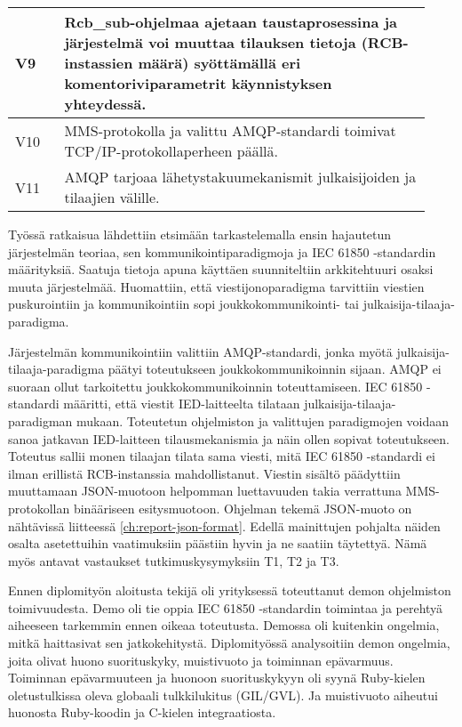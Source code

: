 \begin{table}[ht!]
\begin{tabular}{p{0.11\linewidth} | p{0.82\linewidth}}
		V9 & Rcb\_sub-ohjelmaa ajetaan taustaprosessina ja järjestelmä voi muuttaa tilauksen tietoja (RCB-instassien määrä) syöttämällä eri komentoriviparametrit käynnistyksen yhteydessä. \\
		\hline
		V10 & MMS-protokolla ja valittu AMQP-standardi toimivat TCP/IP-protokollaperheen päällä. \\
		\hline
		V11 & AMQP tarjoaa lähetystakuumekanismit julkaisijoiden ja tilaajien välille. \\
		\hline
	\end{tabular}
\end{table}

Työssä ratkaisua lähdettiin etsimään tarkastelemalla ensin hajautetun järjestelmän teoriaa, sen kommunikointiparadigmoja ja IEC 61850 -standardin määrityksiä. Saatuja tietoja apuna käyttäen suunniteltiin arkkitehtuuri osaksi muuta järjestelmää. Huomattiin, että viestijonoparadigma tarvittiin viestien puskurointiin ja kommunikointiin sopi jouk\-ko\-kom\-mu\-ni\-koin\-ti- tai julkaisija-tilaaja-paradigma.

Järjestelmän kommunikointiin valittiin AMQP-standardi, jonka myötä julkaisija-tilaaja-paradigma päätyi toteutukseen joukkokommunikoinnin sijaan. AMQP ei suoraan ollut tarkoitettu joukkokommunikoinnin toteuttamiseen. IEC 61850 -standardi määritti, että viestit IED-laitteelta tilataan julkaisija-tilaaja-paradigman mukaan. Toteutetun ohjelmiston ja valittujen paradigmojen voidaan sanoa jatkavan IED-laitteen tilausmekanismia ja näin ollen sopivat toteutukseen. Toteutus sallii monen tilaajan tilata sama viesti, mitä IEC 61850 -standardi ei ilman erillistä RCB-instanssia mahdollistanut. Viestin sisältö päädyttiin muuttamaan JSON-muotoon helpomman luettavuuden takia verrattuna MMS-protokollan binääriseen esitysmuotoon. Ohjelman tekemä JSON-muoto on nähtävissä liitteessä \ref{ch:report-json-format}. Edellä mainittujen pohjalta näiden osalta asetettuihin vaatimuksiin päästiin hyvin ja ne saatiin täytettyä. Nämä myös antavat vastaukset tutkimuskysymyksiin T1, T2 ja T3.

Ennen diplomityön aloitusta tekijä oli yrityksessä toteuttanut demon ohjelmiston toimivuudesta. Demo oli tie oppia IEC 61850 -standardin toimintaa ja perehtyä aiheeseen tarkemmin ennen oikeaa toteutusta. Demossa oli kuitenkin ongelmia, mitkä haittasivat sen jatkokehitystä. Diplomityössä analysoitiin demon ongelmia, joita olivat huono suorituskyky, muistivuoto ja toiminnan epävarmuus. Toiminnan epävarmuuteen ja huonoon suorituskykyyn oli syynä Ruby-kielen oletustulkissa oleva globaali tulkkilukitus (GIL/GVL). Ja muistivuoto aiheutui huonosta Ruby-koodin ja C-kielen integraatiosta.

